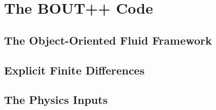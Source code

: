\chapter{The BOUT++ Code}
\label{app_bout}

\section{The Object-Oriented Fluid Framework}
\label{s_obj_oriented}

\section{Explicit Finite Differences}
\label{s_finite_diffs}

\section{The Physics Inputs}
\label{s_phys_input}
